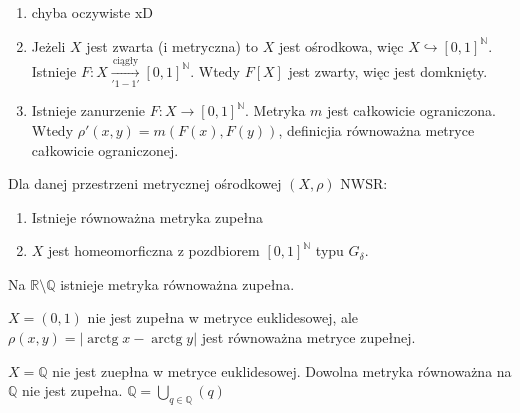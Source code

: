 \begin{dd} 
    \begin{enumerate}[(1)] 
        \item chyba oczywiste xD
        \item Jeżeli $X$ jest zwarta (i metryczna) to $X$ jest ośrodkowa, więc $X \hookrightarrow [0,1]^\mathbb{N}$. \\ 
            Istnieje $F: X \underset{'1-1'}{\xrightarrow{\text{ciągły}}} [0,1]^\mathbb{N}$. Wtedy 
            $F[X]$ jest zwarty, więc jest domknięty.
        \item Istnieje zanurzenie $F: X \to [0,1]^\mathbb{N}$. Metryka $m$ jest całkowicie ograniczona. \\ 
            Wtedy $\rho' (x,y) = m(F(x),F(y))$, definicjia równoważna metryce całkowicie ograniczonej.
    \end{enumerate} 
\end{dd} 
\begin{tw}[tw. Aleksandrowa]
    Dla danej przestrzeni metrycznej ośrodkowej $(X,\rho)$ NWSR: 
    \begin{enumerate}[(1)]
        \item Istnieje równoważna metryka zupełna
        \item $X$ jest homeomorficzna z pozdbiorem $[0,1]^\mathbb{N}$ typu $G_\delta$.
    \end{enumerate} 
\end{tw}
\begin{wn} Na $\mathbb{R} \setminus \mathbb{Q}$ istnieje metryka równoważna zupełna. \end{wn} 
\begin{prz} 
    $X = (0,1)$ nie jest zupełna w metryce euklidesowej, ale $\rho (x,y) = | \operatorname{arctg} x - \operatorname{arctg} y|$ jest 
    równoważna metryce zupełnej.
\end{prz} 
\begin{prz} 
    $X = \mathbb{Q}$ nie jest zuepłna w metryce euklidesowej. Dowolna metryka równoważna na $\mathbb{Q}$ nie jest zupełna. 
    $\mathbb{Q} = \bigcup\limits_{q \in \mathbb{Q}} (q)$
\end{prz}
